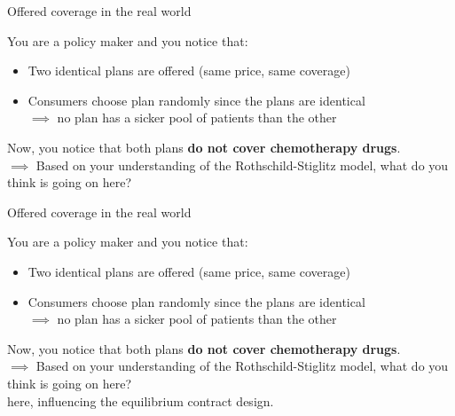 \begin{frame}{Offered coverage in the real world}

    You are a policy maker and you notice that:
    \begin{itemize}
        \item Two identical plans are offered (same price, same coverage)
        \item Consumers choose plan randomly since the plans are identical\\
        $\implies$ no plan has a sicker pool of patients than the other
    \end{itemize}
    \pause
    \vspace{3mm}

    Now, you notice that both plans \textbf{do not cover chemotherapy drugs}.\\
    \pause
    \vspace{3mm}
    $\implies$ Based on your understanding of the Rothschild-Stiglitz model, what do you think is going on here?\\

\end{frame}
\begin{frame}{Offered coverage in the real world}

    You are a policy maker and you notice that:
    \begin{itemize}
        \item Two identical plans are offered (same price, same coverage)
        \item Consumers choose plan randomly since the plans are identical\\
        $\implies$ no plan has a sicker pool of patients than the other
    \end{itemize}
    \vspace{3mm}

    Now, you notice that both plans \textbf{do not cover chemotherapy drugs}.\\
    \vspace{3mm}
    $\implies$ Based on your understanding of the Rothschild-Stiglitz model, what do you think is going on here?\\
    \vspace{3mm}
     here, influencing the equilibrium contract design.


\end{frame}

